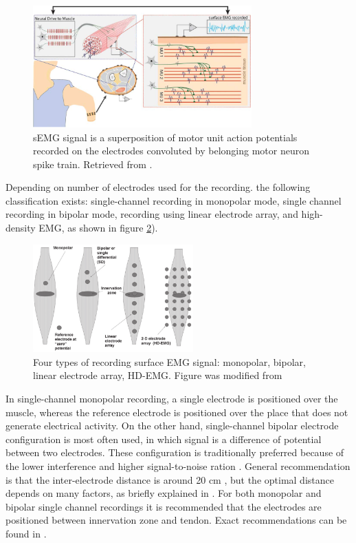 \begin{figure}[ht]
\centering
\includegraphics[width=0.75\textwidth]{Images/introduction/EMG_origin.png}
\caption{sEMG signal is a superposition of motor unit action potentials recorded on the electrodes convoluted by belonging motor neuron spike train. Retrieved from \citep{Farina2014}.}
\label{fig:EMG_origin}
\end{figure}


Depending on number of electrodes used for the recording. the following classification exists: single-channel recording in monopolar mode, single channel recording in bipolar mode, recording using linear electrode array, and high-density EMG, as shown in figure \ref{fig:electrode_types}).
\begin{figure}[ht]
\centering
\includegraphics[width=0.55\textwidth]{Images/introduction/electrode_types.png}
\caption{Four types of recording surface EMG signal: monopolar, bipolar, linear electrode array, HD-EMG. Figure was modified from \citep{Merletti2010}}
\label{fig:electrode_types}
\end{figure}

In single-channel monopolar recording, a single electrode is positioned over the muscle, whereas the reference electrode is positioned over the place that does not generate electrical activity. On the other hand, single-channel bipolar electrode configuration is most often used, in which signal is a difference of potential between two electrodes. These configuration is traditionally preferred because of the lower interference and higher signal-to-noise ration \citep{Merletti-book}. General recommendation is that the inter-electrode distance is around 20 cm \citep{Hermens1999}, but the optimal distance depends on many factors, as briefly explained in \citep{Hakonen2015}. For both monopolar and bipolar single channel recordings it is recommended that the electrodes are positioned between innervation zone and tendon. Exact recommendations can be found in \citet{Hermens1999}.

